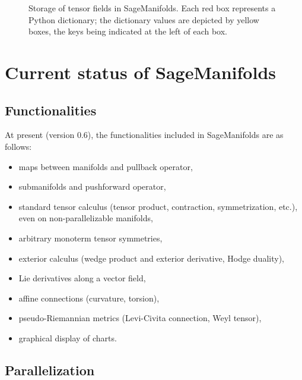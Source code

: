 \documentclass[a4paper]{jpconf}
\newcommand{\soft}[1]{\textsf{#1}}
\newcommand{\code}[1]{\texttt{#1}}
\newcommand{\Sage}{\soft{Sage}}
\newcommand{\SM}{\soft{SageManifolds}}
\begin{document}
\begin{figure}
\begin{center}

\end{center}
\caption{\label{f:tensorfield_structure} Storage of tensor fields in \SM{}.
Each red box represents a Python dictionary; the dictionary values are
depicted by yellow boxes, the keys being indicated at the left of each
box.}
\end{figure}




\section{Current status of SageManifolds}

\subsection{Functionalities} \label{s:functionalities}
At present (version 0.6), the functionalities included in \SM{} are as
follows:  
\begin{itemize}
\item maps between manifolds and  pullback operator,
\item submanifolds and pushforward operator,
\item standard tensor calculus (tensor product, 
contraction, symmetrization, etc.), even on non-parallelizable manifolds,
\item arbitrary monoterm tensor symmetries, 
\item exterior calculus (wedge product and exterior derivative, Hodge duality),
\item Lie derivatives along a vector field,
\item affine connections (curvature, torsion),
\item pseudo-Riemannian metrics (Levi-Civita connection, Weyl tensor),
\item graphical display of charts.
\end{itemize}

\subsection{Parallelization}


\end{document}
